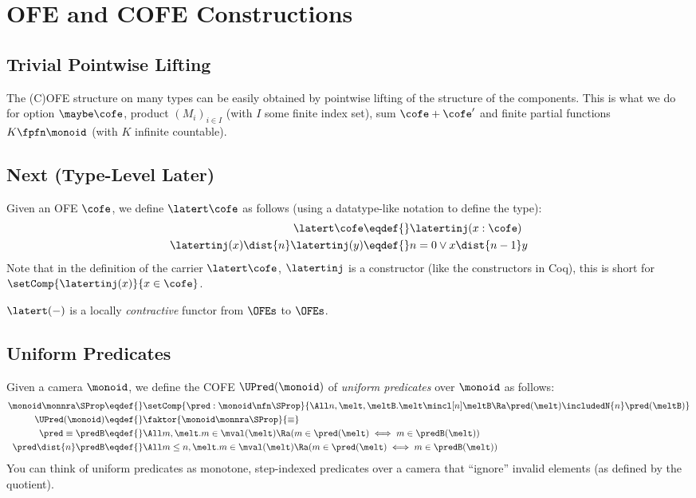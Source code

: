 \section{OFE and COFE Constructions}

\subsection{Trivial Pointwise Lifting}

The (C)OFE structure on many types can be easily obtained by pointwise lifting of the structure of the components.
This is what we do for option $\maybe\cofe$, product $(M_i)_{i \in I}$ (with $I$ some finite index set), sum $\cofe + \cofe'$ and finite partial functions $K \fpfn \monoid$ (with $K$ infinite countable).

\subsection{Next (Type-Level Later)}

Given an OFE $\cofe$, we define $\latert\cofe$ as follows (using a datatype-like notation to define the type):
\begin{align*}
  \latert\cofe \eqdef{}& \latertinj(x:\cofe) \\
  \latertinj(x) \dist{n} \latertinj(y) \eqdef{}& n = 0 \lor x \dist{n-1} y
\end{align*}
Note that in the definition of the carrier $\latert\cofe$, $\latertinj$ is a constructor (like the constructors in Coq), \ie this is short for $\setComp{\latertinj(x)}{x \in \cofe}$.

$\latert(-)$ is a locally \emph{contractive} functor from $\OFEs$ to $\OFEs$.


\subsection{Uniform Predicates}

Given a camera $\monoid$, we define the COFE $\UPred(\monoid)$ of \emph{uniform predicates} over $\monoid$ as follows:
\begin{align*}
\monoid \monnra \SProp \eqdef{}& \setComp{\pred: \monoid \nfn \SProp}
{\All n, \melt, \meltB. \melt \mincl[n] \meltB \Ra \pred(\melt) \includedN{n} \pred(\meltB)} \\
  \UPred(\monoid) \eqdef{}&  \faktor{\monoid \monnra \SProp}{\equiv} \\
  \pred \equiv \predB \eqdef{}& \All m, \melt. m \in \mval(\melt) \Ra (m \in \pred(\melt) \iff  m \in \predB(\melt)) \\
  \pred \dist{n} \predB \eqdef{}& \All m \le n, \melt. m \in \mval(\melt) \Ra (m \in \pred(\melt) \iff  m \in \predB(\melt))
\end{align*}
You can think of uniform predicates as monotone, step-indexed predicates over a camera that ``ignore'' invalid elements (as defined by the quotient).

